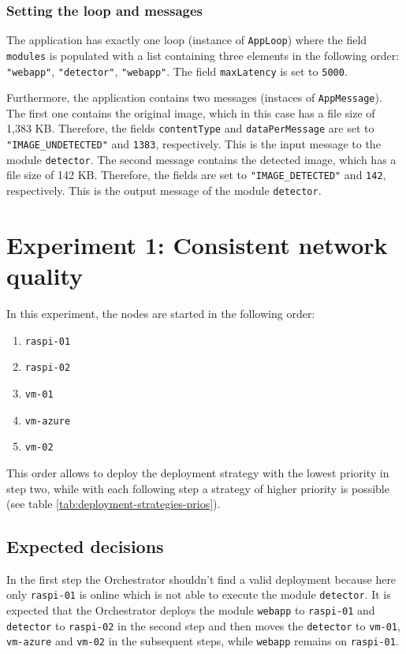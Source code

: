 \subsubsection*{Setting the loop and messages}
The application has exactly one loop (instance of \texttt{AppLoop}) where the field \texttt{modules} is populated with a list containing three elements in the following order:
\texttt{"webapp"}, \texttt{"detector"}, \texttt{"webapp"}.
The field \texttt{maxLatency} is set to \texttt{5000}.

Furthermore, the application contains two messages (instaces of \texttt{AppMessage}).
The first one contains the original image, which in this case has a file size of 1,383 KB. Therefore, the fields \texttt{contentType} and \texttt{dataPerMessage} are set to \texttt{"IMAGE\_UNDETECTED"} and  \texttt{1383}, respectively. This is the input message to the module \texttt{detector}.
The second message contains the detected image, which has a file size of 142 KB. Therefore, the fields are set to \texttt{"IMAGE\_DETECTED"} and \texttt{142}, respectively. This is the output message of the module \texttt{detector}.









\section{Experiment 1: Consistent network quality\label{sec:eval-exp-1}}

In this experiment, the nodes are started in the following order:
\begin{enumerate}
    \item \texttt{raspi-01}
    \item \texttt{raspi-02}
    \item \texttt{vm-01}
    \item \texttt{vm-azure}
    \item \texttt{vm-02}
\end{enumerate}
This order allows to deploy the deployment strategy with the lowest priority in step two, while with each following step a strategy of higher priority is possible (see table \ref{tab:deployment-strategies-prios}).

\subsection{Expected decisions}
In the first step the Orchestrator shouldn't find a valid deployment because here only \texttt{raspi-01} is online which is not able to execute the module \texttt{detector}.
It is expected that the Orchestrator deploys the module \texttt{webapp} to \texttt{raspi-01} and \texttt{detector} to \texttt{raspi-02} in the second step and then moves the \texttt{detector} to \texttt{vm-01}, \texttt{vm-azure} and \texttt{vm-02} in the subsequent steps, while \texttt{webapp} remains on \texttt{raspi-01}.

